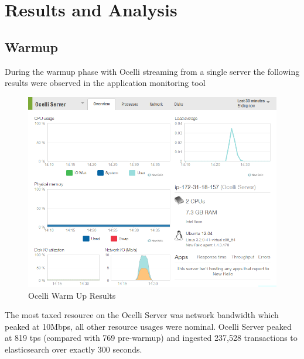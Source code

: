 \documentclass{llncs}
\begin{document}
\section{Results and Analysis}
\subsection{Warmup}
During the warmup phase with Ocelli streaming from a single server the following results were observed in the application monitoring tool

\begin{figure}[h]
    \centering
    \includegraphics[scale=0.7]{app4}
    \caption{Ocelli Warm Up Results}
    \label{fig:ocelli_dm}
\end{figure}

The most taxed resource on the Ocelli Server was network bandwidth which peaked at 10Mbps, all other resource usages were nominal. Ocelli Server peaked at 819 tps (compared with 769 pre-warmup) and ingested 237,528 transactions to elasticsearch over exactly 300 seconds.
\end{document}
